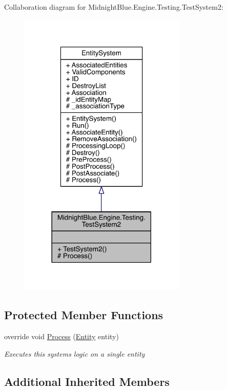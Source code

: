 Collaboration diagram for Midnight\+Blue.\+Engine.\+Testing.\+Test\+System2\+:
\nopagebreak
\begin{figure}[H]
\begin{center}
\leavevmode
\includegraphics[width=225pt]{class_midnight_blue_1_1_engine_1_1_testing_1_1_test_system2__coll__graph}
\end{center}
\end{figure}
\subsection*{Protected Member Functions}
\begin{DoxyCompactItemize}
\item 
override void \hyperlink{class_midnight_blue_1_1_engine_1_1_testing_1_1_test_system2_ab8a9ea91aa5b014101ce418f66889ab0}{Process} (\hyperlink{class_midnight_blue_1_1_engine_1_1_entity_component_1_1_entity}{Entity} entity)
\begin{DoxyCompactList}\small\item\em Executes this systems logic on a single entity \end{DoxyCompactList}\end{DoxyCompactItemize}
\subsection*{Additional Inherited Members}


